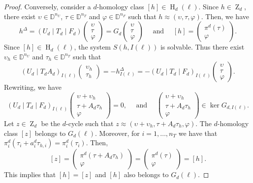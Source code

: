 \documentclass[a4paper,10pt]{article}
\newcommand{\bbd}{\mathbb{D}}
\DeclareMathOperator{\Zo}{Z}
\DeclareMathOperator{\Ho}{H}
\begin{document}
\begin{proof}
Conversely, consider a \(d\)-homology class \([h] \in \Ho_d(\ell)\). Since \(h \in \Zo_d\), there exist \(\upsilon \in \bbd^{n_U}\), \(\tau \in \bbd^{n_T}\) and \(\varphi \in \bbd^{n_F}\) such that \(h \approx (\upsilon,\tau,\varphi)\). Then, we have
\[
h^{\Delta}=
\left(U_d \mid T_d \mid F_d\right)
\left(\begin{array}{c}\upsilon\\ \tau\\ \varphi\end{array}\right)
=G_d
\left(\begin{array}{c}\upsilon\\ \tau\\ \varphi\end{array}\right)
\quad \text{ and } \quad
[h] = 
\left(\begin{array}{c}\pi^{d}(\tau) \\ \varphi\end{array}\right).
\]
Since \([h] \in \Ho_d(\ell)\), the system \(S(h,I(\ell))\) is solvable.
Thus there exist \(\upsilon_h \in \bbd^{n_U}\) and \(\tau_h \in \bbd^{n_T}\) such that
\[
\left(U_{d} \mid T_{d} A_d\right)_{I(\ell)}
\left(\begin{array}{c}\upsilon_h\\ \tau_h\end{array}\right)
=- h^{\Delta}_{I(\ell)}=
-\left(U_{d} \mid T_{d} \mid F_{d}\right)_{I(\ell)}
\left(\begin{array}{c}\upsilon\\ \tau\\ \varphi\end{array}\right).
\]
Rewriting, we have
\[
\left(U_{d} \mid T_{d} \mid F_{d}\right)_{I(\ell)}
\left(\begin{array}{c}\upsilon + \upsilon_h\\\tau + A_d \tau_h\\\varphi\end{array}\right)
=0,
\quad \text{ and } \quad
\left(\begin{array}{c}\upsilon + \upsilon_h\\\tau + A_d \tau_h\\\varphi\end{array}\right) 
\in \ker G_{d,I(\ell)}.
\]
Let \(z \in \Zo_d\) be the \(d\)-cycle such that \(z \approx (\upsilon+\upsilon_h, \tau + A_d\tau_h,\varphi)\). The \(d\)-homology class \([z]\) belongs to \(G_d(\ell)\). Moreover, for \(i=1,\dots,n_T\) we have that \(\pi^d_i(\tau_i + a^d_i\tau_{h,i})=\pi^d_i(\tau_i)\). Then,
\[
[z] = 
\left(\begin{array}{c}\pi^d(\tau + A_d \tau_h) \\ \varphi \end{array}\right) = 
\left(\begin{array}{c}\pi^d(\tau) \\ \varphi \end{array}\right) = [h].
\]
This implies that \([h]=[z]\) and \([h]\) also belongs to \(G_d(\ell)\).
\end{proof}
\end{document}

